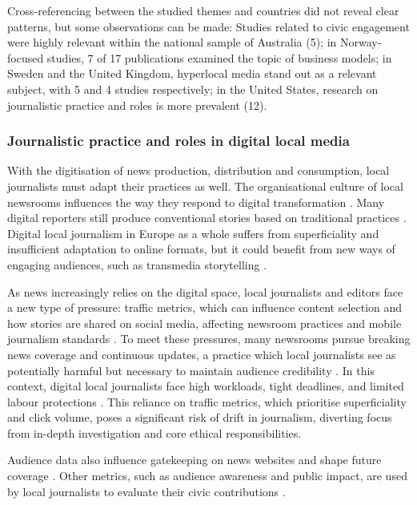 \documentclass[english]{textolivre}
\begin{document}
Cross-referencing between the studied themes and countries did not reveal clear patterns, but some observations can be made: Studies related to civic engagement were highly relevant within the national sample of Australia (5); in Norway-focused studies, 7 of 17 publications examined the topic of business models; in Sweden and the United Kingdom, hyperlocal media stand out as a relevant subject, with 5 and 4 studies respectively; in the United States, research on journalistic practice and roles is more prevalent (12).

\subsubsection{Journalistic practice and roles in digital local media}

With the digitisation of news production, distribution and consumption, local journalists must adapt their practices as well. The organisational culture of local newsrooms influences the way they respond to digital transformation \cite{ohara2023}. Many digital reporters still produce conventional stories based on traditional practices \cite{ryfe2016}. Digital local journalism in Europe as a whole suffers from superficiality and insufficient adaptation to online formats, but it could benefit from new ways of engaging audiences, such as transmedia storytelling \cite{rivasderoca2020}.

As news increasingly relies on the digital space, local journalists and editors face a new type of pressure: traffic metrics, which can influence content selection and how stories are shared on social media, affecting newsroom practices and mobile journalism standards \cite{blanchettneheli2018, perreault2019}. To meet these pressures, many newsrooms pursue breaking news coverage and continuous updates, a practice which local journalists see as potentially harmful but necessary to maintain audience credibility \cite{usher2018}. In this context, digital local journalists face high workloads, tight deadlines, and limited labour protections \cite{higginsdobney2021}. This reliance on traffic metrics, which prioritise superficiality and click volume, poses a significant risk of drift in journalism, diverting focus from in-depth investigation and core ethical responsibilities.

Audience data also influence gatekeeping on news websites and shape future coverage \cite{blanchett2021}. Other metrics, such as audience awareness and public impact, are used by local journalists to evaluate their civic contributions \cite{powers2018}.
\end{document}

